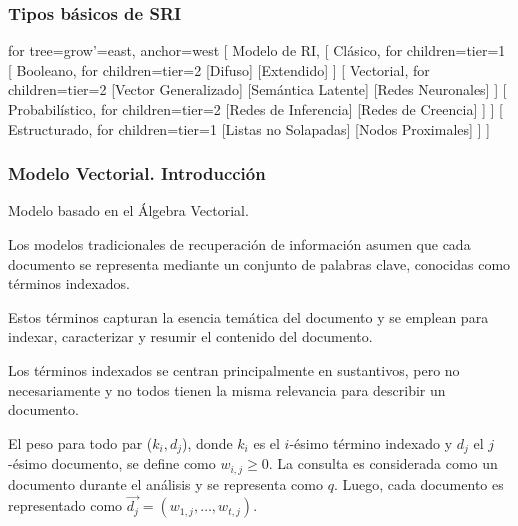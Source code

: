 \documentclass[
	10pt, %
	aspectratio=169, %
]{beamer}
\begin{document}

\begin{frame}
	
	\frametitle{Tipos básicos de SRI}
	
	\centering
	\begin{forest}
		for tree={grow'=east, anchor=west}
		[ Modelo de RI, 
			[
				Clásico, 
				for children={tier=1} 
				[
					Booleano, 
					for children={tier=2} 
						[Difuso]
						[Extendido]
				]
				[
					Vectorial, 
					for children={tier=2} 
						[Vector Generalizado]
						[Semántica Latente]
						[Redes Neuronales]
				]
				[
				Probabilístico, 
				for children={tier=2} 
					[Redes de Inferencia]
					[Redes de Creencia]
				]
			] 
			[
				Estructurado, 
				for children={tier=1}
					[Listas no Solapadas]
					[Nodos Proximales]
			]
		]
	\end{forest}

\end{frame}


\begin{frame}
	
	\frametitle{Modelo Vectorial. Introducción}
	
	Modelo basado en el Álgebra Vectorial.
	
	\vspace{1\baselineskip}
	
	Los modelos tradicionales de recuperación de información asumen que cada documento se representa mediante un conjunto de palabras clave, conocidas como términos indexados. 
	
	\vspace{1\baselineskip}
	
	\pause
	Estos términos capturan la esencia temática del documento y se emplean para indexar, caracterizar y resumir el contenido del documento. 
	
	\vspace{1\baselineskip}
	Los términos indexados se centran principalmente en sustantivos, pero no necesariamente y no todos tienen la misma relevancia para describir un documento.
	
	\pause
	\vspace{1\baselineskip}
	\begin{alertblock}{} 
		El peso para todo par ($k_i, d_j$), donde $k_i$ es el $i$-ésimo término indexado y $d_j$ el $j$-ésimo documento, se define como $w_{i,j} \geq 0$. La consulta es considerada como un documento durante el análisis y se representa como $q$. Luego, cada documento es representado como $\vec{d_j} = (w_{1, j}, \dots, w_{t, j})$.
	\end{alertblock}
	
\end{frame}
\end{document}
